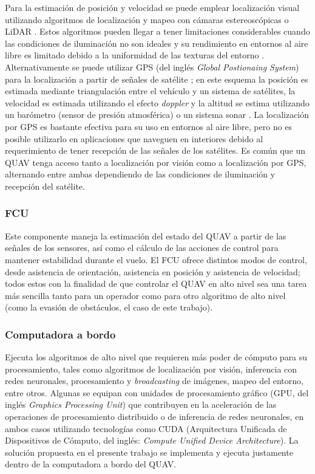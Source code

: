 Para la estimación de posición y velocidad se puede emplear localización visual utilizando algoritmos de localización y mapeo con cámaras estereoscópicas o LiDAR \cite{multidrone2017review}. Estos algoritmos pueden llegar a tener limitaciones considerables cuando las condiciones de iluminación no son ideales y su rendimiento en entornos al aire libre es limitado debido a la uniformidad de las texturas del entorno \cite{multidrone2017review}. Alternativamente se puede utilizar GPS (del inglés \textit{Global Postionaing System}) para la localización a partir de señales de satélite \cite{multidrone2017review}; en este esquema la posición es estimada mediante triangulación entre el vehículo y un sistema de satélites, la velocidad es estimada utilizando el efecto \textit{doppler} y la altitud se estima utilizando un barómetro (sensor de presión atmosférica) o un sistema sonar \cite{multidrone2017review}. La localización por GPS es bastante efectiva para su uso en entornos al aire libre, pero no es posible utilizarlo en aplicaciones que naveguen en interiores debido al requerimiento de tener recepción de las señales de los satélites. Es común que un QUAV tenga acceso tanto a localización por visión como a localización por GPS, alternando entre ambas dependiendo de las condiciones de iluminación y recepción del satélite.

\subsubsection*{FCU}
\label{sec:QUAV-FCU}

Este componente maneja la estimación del estado del QUAV a partir de las señales de los sensores, así como el cálculo de las acciones de control para mantener estabilidad durante el vuelo. El FCU ofrece distintos modos de control, desde asistencia de orientación, asistencia en posición y asistencia de velocidad; todos estos con la finalidad de que controlar el QUAV en alto nivel sea una tarea más sencilla tanto para un operador como para otro algoritmo de alto nivel (como la evasión de obstáculos, el caso de este trabajo). 

\subsubsection*{Computadora a bordo}

Ejecuta los algoritmos de alto nivel que requieren más poder de cómputo para su procesamiento, tales como algoritmos de localización por visión, inferencia con redes neuronales, procesamiento y \textit{broadcasting} de imágenes, mapeo del entorno, entre otros. Algunas se equipan con unidades de procesamiento gráfico (GPU, del inglés \textit{Graphics Processing Unit}) que contribuyen en la aceleración de las operaciones de procesamiento distribuido o de inferencia de redes neuronales, en ambos casos utilizando tecnologías como CUDA (Arquitectura Unificada de Dispositivos de Cómputo, del inglés: \textit{Compute Unified Device Architecture}). La solución propuesta en el presente trabajo se implementa y ejecuta justamente dentro de la computadora a bordo del QUAV.

